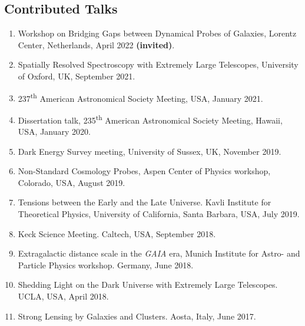 \documentclass[margin, line]{res}
\begin{document}
\begin{resume}
\section{\sc Contributed Talks}
\begin{enumerate}
	\item Workshop on Bridging Gaps between Dynamical Probes of Galaxies, Lorentz Center, Netherlands, April 2022 \textbf{(invited)}.
	\item Spatially Resolved Spectroscopy with Extremely Large Telescopes, University of Oxford, UK, September 2021. %
	\item 237\textsuperscript{th} American Astronomical Society Meeting, USA, January 2021. %
	\item Dissertation talk, 235\textsuperscript{th} American Astronomical Society Meeting, Hawaii, USA, January 2020.
	\item Dark Energy Survey meeting, University of Sussex, UK, November 2019. %
	\item Non-Standard Cosmology Probes, Aspen Center of Physics workshop, Colorado, USA, August 2019.
	\item Tensions between the Early and the Late Universe. Kavli Institute for Theoretical Physics, University of California, Santa Barbara, USA, July 2019.
	\item Keck Science Meeting. Caltech, USA, September 2018.
	\item Extragalactic distance scale in the \textit{GAIA} era, Munich Institute for Astro- and Particle Physics workshop. Germany, June 2018.
	\item Shedding Light on the Dark Universe with Extremely Large Telescopes. UCLA, USA, April 2018.
	\item Strong Lensing by Galaxies and Clusters. Aosta, Italy, June 2017.
\end{enumerate}


\end{resume}
\end{document}
